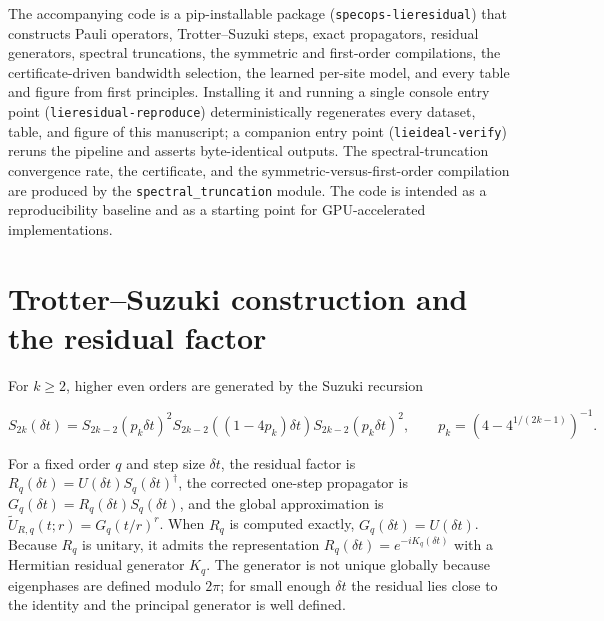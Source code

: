 \documentclass[aps,prresearch,reprint,superscriptaddress,nofootinbib,amsmath,amssymb]{revtex4-2}
\newcommand{\dt}{\delta t}
\begin{document}
The accompanying code is a pip-installable package (\texttt{specops-lieresidual}) that constructs Pauli operators, Trotter--Suzuki steps, exact propagators, residual generators, spectral truncations, the symmetric and first-order compilations, the certificate-driven bandwidth selection, the learned per-site model, and every table and figure from first principles. Installing it and running a single console entry point (\texttt{lieresidual-reproduce}) deterministically regenerates every dataset, table, and figure of this manuscript; a companion entry point (\texttt{lieideal-verify}) reruns the pipeline and asserts byte-identical outputs. The spectral-truncation convergence rate, the certificate, and the symmetric-versus-first-order compilation are produced by the \texttt{spectral\_truncation} module. The code is intended as a reproducibility baseline and as a starting point for GPU-accelerated implementations.



\appendix

\section{Trotter--Suzuki construction and the residual factor}
\label{app:methods}

For $k\geq2$, higher even orders are generated by the Suzuki recursion
\begin{widetext}
\begin{equation}
    S_{2k}(\dt)=S_{2k-2}(p_k\dt)^2S_{2k-2}((1-4p_k)\dt)S_{2k-2}(p_k\dt)^2,
    \qquad
    p_k=\left(4-4^{1/(2k-1)}\right)^{-1}.
    \label{eq:suzuki-recursion}
\end{equation}
\end{widetext}
For a fixed order $q$ and step size $\dt$, the residual factor is $R_q(\dt)=U(\dt)S_q(\dt)^\dagger$, the corrected one-step propagator is $G_q(\dt)=R_q(\dt)S_q(\dt)$, and the global approximation is $\widetilde U_{R,q}(t;r)=G_q(t/r)^r$. When $R_q$ is computed exactly, $G_q(\dt)=U(\dt)$. Because $R_q$ is unitary, it admits the representation $R_q(\dt)=e^{-iK_q(\dt)}$ with a Hermitian residual generator $K_q$. The generator is not unique globally because eigenphases are defined modulo $2\pi$; for small enough $\dt$ the residual lies close to the identity and the principal generator is well defined.
\end{document}

